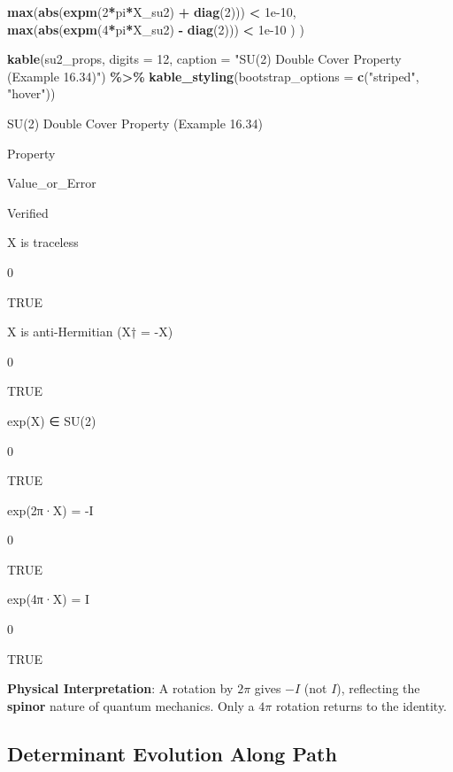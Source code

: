 \documentclass[
]{book}
\newenvironment{Shaded}{\begin{snugshade}}{\end{snugshade}}
\newcommand{\AttributeTok}[1]{\textcolor[rgb]{0.13,0.29,0.53}{#1}}
\newcommand{\DecValTok}[1]{\textcolor[rgb]{0.00,0.00,0.81}{#1}}
\newcommand{\FloatTok}[1]{\textcolor[rgb]{0.00,0.00,0.81}{#1}}
\newcommand{\FunctionTok}[1]{\textcolor[rgb]{0.13,0.29,0.53}{\textbf{#1}}}
\newcommand{\NormalTok}[1]{#1}
\newcommand{\SpecialCharTok}[1]{\textcolor[rgb]{0.81,0.36,0.00}{\textbf{#1}}}
\newcommand{\StringTok}[1]{\textcolor[rgb]{0.31,0.60,0.02}{#1}}
\theoremstyle{definition}
\theoremstyle{definition}
\theoremstyle{definition}
\theoremstyle{definition}
\theoremstyle{remark}
\begin{document}
\begin{Shaded}
\begin{Highlighting}[]
    \FunctionTok{max}\NormalTok{(}\FunctionTok{abs}\NormalTok{(}\FunctionTok{expm}\NormalTok{(}\DecValTok{2}\SpecialCharTok{*}\NormalTok{pi}\SpecialCharTok{*}\NormalTok{X\_su2) }\SpecialCharTok{+} \FunctionTok{diag}\NormalTok{(}\DecValTok{2}\NormalTok{))) }\SpecialCharTok{\textless{}} \FloatTok{1e{-}10}\NormalTok{,}
    \FunctionTok{max}\NormalTok{(}\FunctionTok{abs}\NormalTok{(}\FunctionTok{expm}\NormalTok{(}\DecValTok{4}\SpecialCharTok{*}\NormalTok{pi}\SpecialCharTok{*}\NormalTok{X\_su2) }\SpecialCharTok{{-}} \FunctionTok{diag}\NormalTok{(}\DecValTok{2}\NormalTok{))) }\SpecialCharTok{\textless{}} \FloatTok{1e{-}10}
\NormalTok{  )}
\NormalTok{)}

\FunctionTok{kable}\NormalTok{(su2\_props,}
      \AttributeTok{digits =} \DecValTok{12}\NormalTok{,}
      \AttributeTok{caption =} \StringTok{"SU(2) Double Cover Property (Example 16.34)"}\NormalTok{) }\SpecialCharTok{\%\textgreater{}\%}
  \FunctionTok{kable\_styling}\NormalTok{(}\AttributeTok{bootstrap\_options =} \FunctionTok{c}\NormalTok{(}\StringTok{"striped"}\NormalTok{, }\StringTok{"hover"}\NormalTok{))}
\end{Highlighting}
\end{Shaded}

\label{tab:su2-double-cover}SU(2) Double Cover Property (Example 16.34)

Property

Value\_or\_Error

Verified

X is traceless

0

TRUE

X is anti-Hermitian (X† = -X)

0

TRUE

exp(X) ∈ SU(2)

0

TRUE

exp(2π·X) = -I

0

TRUE

exp(4π·X) = I

0

TRUE

\textbf{Physical Interpretation}: A rotation by \(2\pi\) gives \(-I\) (not \(I\)), reflecting the \textbf{spinor} nature of quantum mechanics. Only a \(4\pi\) rotation returns to the identity.

\subsection{Determinant Evolution Along Path}\label{determinant-evolution-along-path}
\end{document}
